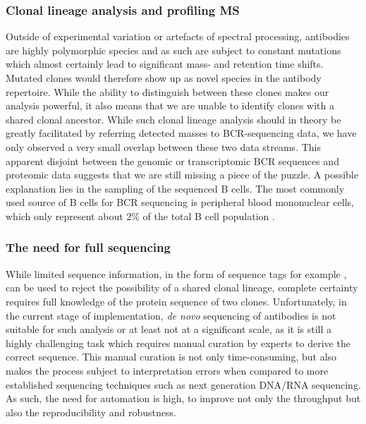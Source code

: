 \subsubsection{Clonal lineage analysis and profiling MS}
Outside of experimental variation or artefacts of spectral processing, antibodies are highly polymorphic species and as such are subject to constant mutations which almost certainly lead to significant mass- and retention time shifts. Mutated clones would therefore show up as novel species in the antibody repertoire. While the ability to distinguish between these clones makes our analysis powerful, it also means that we are unable to identify clones with a shared clonal ancestor. While such clonal lineage analysis should in theory be greatly facilitated by referring detected masses to BCR-sequencing data, we have only observed a very small overlap between these two data streams. This apparent disjoint between the genomic or transcriptomic BCR sequences and proteomic data suggests that we are still missing a piece of the puzzle. A possible explanation lies in the sampling of the sequenced B cells. The most commonly used source of B cells for BCR sequencing is peripheral blood mononuclear cells, which only represent about 2\% of the total B cell population \cite{guthals2017de}.

\subsubsection{The need for full sequencing}
While limited sequence information, in the form of sequence tags for example \cite{tabb2008directag:}, can be used to reject the possibility of a shared clonal lineage, complete certainty requires full knowledge of the protein sequence of two clones. Unfortunately, in the current stage of implementation, \emph{de novo} sequencing of antibodies is not suitable for such analysis or at least not at a significant scale, as it is still a highly challenging task which requires manual curation by experts to derive the correct sequence. This manual curation is not only time-consuming, but also makes the process subject to interpretation errors when compared to more established sequencing techniques such as next generation DNA/RNA sequencing. As such, the need for automation is high, to improve not only the throughput but also the reproducibility and robustness.

